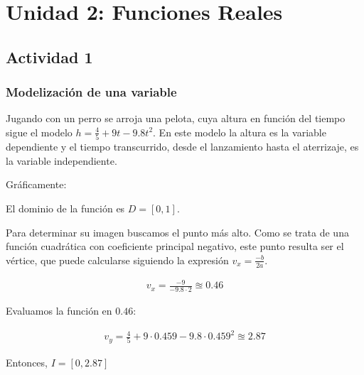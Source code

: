 \section*{Unidad 2: Funciones Reales}
%

\subsection*{Actividad 1}
\subsubsection*{Modelización de una variable}

Jugando con un perro se arroja una pelota, 
cuya altura en función del tiempo sigue el modelo $h = \frac{4}{5} + 9t - 9.8t^2$. 
En este modelo la altura es la variable dependiente y el tiempo transcurrido, 
desde el lanzamiento hasta el aterrizaje, 
es la variable independiente.

Gráficamente:

\begin{center}
\end{center}

El dominio de la función es $D = [0,1]$.

Para determinar su imagen buscamos el punto más alto.
Como se trata de una función cuadrática con coeficiente principal negativo,
este punto resulta ser el vértice,
que puede calcularse siguiendo la expresión $v_{x} = \frac{-b}{2a}$.

\begin{align*}
    v_{x} = \frac{-9}{-9.8 \cdot 2} \approxeq 0.46
\end{align*}

Evaluamos la función en $0.46$:

\begin{align*}
    v_{y} = \frac{4}{5} + 9 \cdot 0.459 - 9.8 \cdot 0.459^2 \approxeq 2.87
\end{align*}

Entonces, $I = [0, 2.87]$
